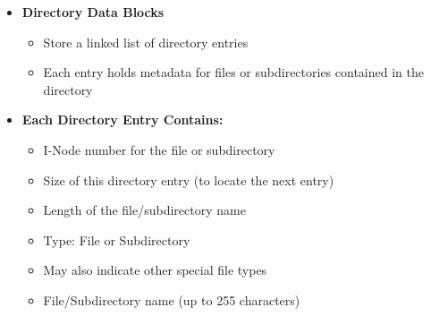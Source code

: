 \documentclass[8pt,twocolumn]{article}
\begin{document}
\begin{itemize}
  \small
  \setlength{\itemsep}{0pt} %
  \setlength{\parskip}{0pt}
  \item \textbf{Directory Data Blocks}\vspace{-0.6em}
  \begin{itemize}
    \setlength{\itemsep}{0pt} %
    \setlength{\parskip}{0pt}
      \item Store a linked list of directory entries
      \item Each entry holds metadata for files or subdirectories contained in the directory
  \end{itemize}
  \vspace{-0.6em}
  \item \textbf{Each Directory Entry Contains:}\vspace{-0.6em}
  \begin{itemize}
    \setlength{\itemsep}{0pt} %
    \setlength{\parskip}{0pt}
      \item I-Node number for the file or subdirectory
      \item Size of this directory entry (to locate the next entry)
      \item Length of the file/subdirectory name
      \item Type: File or Subdirectory
      \item May also indicate other special file types
      \item File/Subdirectory name (up to 255 characters)
  \end{itemize}\vspace{-0.6em}
\end{itemize}
\noindent{}
\end{document}
